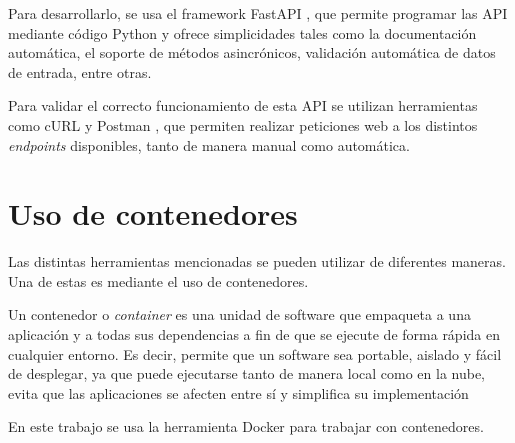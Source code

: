 Para desarrollarlo, se usa el framework FastAPI \citep{WEBSITE:fastapi}, que permite programar las API mediante código Python y ofrece simplicidades tales como la documentación automática, el soporte de métodos asincrónicos, validación automática de datos de entrada, entre otras.

Para validar el correcto funcionamiento de esta API se utilizan herramientas como cURL \citep{WEBSITE:curl} y Postman \citep{WEBSITE:postman}, que permiten realizar peticiones web a los distintos \textit{endpoints} disponibles, tanto de manera manual como automática.

\section{Uso de contenedores}

Las distintas herramientas mencionadas se pueden utilizar de diferentes maneras. Una de estas es mediante el uso de contenedores.

Un contenedor o \textit{container} es una unidad de software que empaqueta a una aplicación y a todas sus dependencias a fin de que se ejecute de forma rápida en cualquier entorno. Es decir, permite que un software sea portable, aislado y fácil de desplegar, ya que puede ejecutarse tanto de manera local como en la nube, evita que las aplicaciones se afecten entre sí y simplifica su implementación

En este trabajo se usa la herramienta Docker \citep{WEBSITE:docker} para trabajar con contenedores.